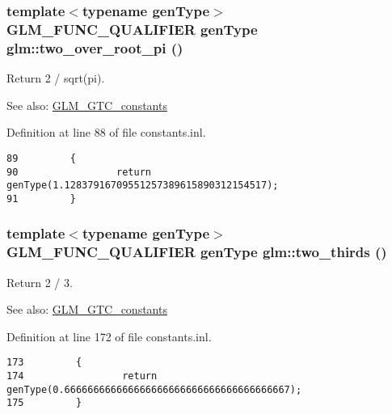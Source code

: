 \hypertarget{group__gtc__constants_g542f9a504c7cf25b6c0108adb4a9f97a}{
\subsubsection[two\_\-over\_\-root\_\-pi]{\setlength{\rightskip}{0pt plus 5cm}template$<$typename genType$>$ GLM\_\-FUNC\_\-QUALIFIER genType glm::two\_\-over\_\-root\_\-pi ()}}
\label{group__gtc__constants_g542f9a504c7cf25b6c0108adb4a9f97a}


Return 2 / sqrt(pi). \begin{Desc}
\item[See also:]\hyperlink{group__gtc__constants}{GLM\_\-GTC\_\-constants} \end{Desc}


Definition at line 88 of file constants.inl.

\begin{Code}\begin{verbatim}89         {
90                 return genType(1.12837916709551257389615890312154517);
91         }
\end{verbatim}
\end{Code}


\hypertarget{group__gtc__constants_g846874e34295fed917708f134f754ae4}{
\subsubsection[two\_\-thirds]{\setlength{\rightskip}{0pt plus 5cm}template$<$typename genType$>$ GLM\_\-FUNC\_\-QUALIFIER genType glm::two\_\-thirds ()}}
\label{group__gtc__constants_g846874e34295fed917708f134f754ae4}


Return 2 / 3. \begin{Desc}
\item[See also:]\hyperlink{group__gtc__constants}{GLM\_\-GTC\_\-constants} \end{Desc}


Definition at line 172 of file constants.inl.

\begin{Code}\begin{verbatim}173         {
174                 return genType(0.666666666666666666666666666666666666667);
175         }
\end{verbatim}
\end{Code}


